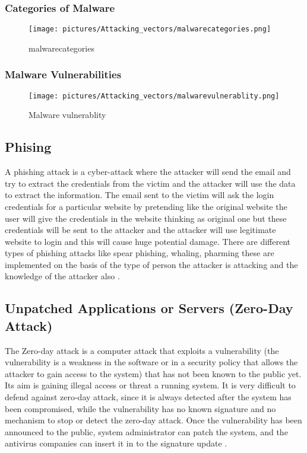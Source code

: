 \documentclass[twocolumn]{article}
\begin{document}
\subsubsection{Categories of Malware}

\begin{figure}[H]
\centering
\texttt{[image: pictures/Attacking\_vectors/malwarecategories.png]}
\caption{malwarecategories}
\end{figure}

\textcolor{red}{\lipsum[1]}


\subsubsection{Malware Vulnerabilities}


\begin{figure}[H]
\centering
\texttt{[image: pictures/Attacking\_vectors/malwarevulnerablity.png]}
\caption{Malware vulnerablity}
\end{figure}
\subsection{Phising}
A phishing attack is a cyber-attack where the attacker will send the email and try to extract the credentials from the victim and the attacker
will use the data to extract the information. The email sent to the victim will ask the login credentials for a particular website by pretending like the
original website the user will give the credentials in the website thinking as original one but these credentials will be sent to the attacker and the attacker
will use legitimate website to login and this will cause huge potential damage. There are different types of phishing attacks like spear phishing, whaling,
pharming these are implemented on the basis of the type of person the attacker is attacking and the knowledge of the attacker also 
  \cite{kanakam2022bruteforce}.
\subsection{Unpatched Applications or Servers (Zero-Day Attack)}

The Zero-day attack is a computer attack that exploits a vulnerability (the vulnerability is a weakness in the software or in a security policy that allows the attacker to gain access to the system) that has not been known to the public yet. Its aim is gaining illegal access or threat a running system. It is very difficult to defend against zero-day attack, since it is always detected after the system has been compromised, while the vulnerability has no known signature and no mechanism to stop or detect the zero-day attack. Once the vulnerability has been announced to the public, system administrator can patch the system, and the antivirus companies can insert it in to the signature update  \cite{al2019zero}.
\end{document}
